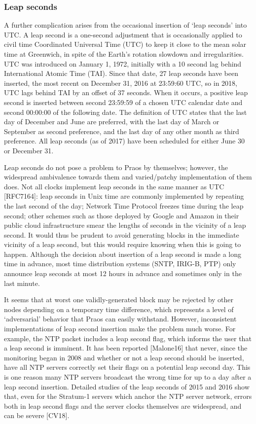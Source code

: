 \documentclass[11pt,a4paper]{article}
\begin{document}
\subsubsection{Leap seconds}
\label{leap-seconds}

A further complication arises from the occasional insertion of `leap
seconds' into UTC. A leap second is a one-second adjustment that is
occasionally applied to civil time Coordinated Universal Time (UTC) to
keep it close to the mean solar time at Greenwich, in spite of the
Earth's rotation slowdown and irregularities. UTC was introduced on
January 1, 1972, initially with a 10 second lag behind International
Atomic Time (TAI). Since that date, 27 leap seconds have been inserted,
the most recent on December 31, 2016 at 23:59:60 UTC, so in 2018, UTC
lags behind TAI by an offset of 37 seconds. When it occurs, a positive
leap second is inserted between second 23:59:59 of a chosen UTC calendar
date and second 00:00:00 of the following date. The definition of UTC
states that the last day of December and June are preferred, with the
last day of March or September as second preference, and the last day of
any other month as third preference. All leap seconds (as of 2017) have
been scheduled for either June 30 or December 31.

Leap seconds do not pose a problem to Praos by themselves; however, the
widespread ambivalence towards them and varied/patchy implementation of
them does. Not all clocks implement leap seconds in the same manner as
UTC {[}RFC7164{]}: leap seconds in Unix time are commonly implemented by
repeating the last second of the day; Network Time Protocol freezes time
during the leap second; other schemes such as those deployed by Google
and Amazon in their public cloud infrastructure smear the lengths of
seconds in the vicinity of a leap second. It would thus be prudent to
avoid generating blocks in the immediate vicinity of a leap second, but
this would require knowing when this is going to happen. Although the
decision about insertion of a leap second is made a long time in
advance, most time distribution systems (SNTP, IRIG-B, PTP) only
announce leap seconds at most 12 hours in advance and sometimes only in
the last minute.

It seems that at worst one validly-generated block may be rejected by
other nodes depending on a temporary time difference, which represents a
level of `adversarial' behavior that Praos can easily withstand.
However, inconsistent implementations of leap second insertion make the
problem much worse. For example, the NTP packet includes a leap second
flag, which informs the user that a leap second is imminent. It has been
reported {[}Malone16{]} that never, since the monitoring began in 2008
and whether or not a leap second should be inserted, have all NTP
servers correctly set their flags on a potential leap second day. This
is one reason many NTP servers broadcast the wrong time for up to a day
after a leap second insertion. Detailed studies of the leap seconds of
2015 and 2016 show that, even for the Stratum-1 servers which anchor the
NTP server network, errors both in leap second flags and the server
clocks themselves are widespread, and can be severe {[}CV18{]}.
\end{document}
